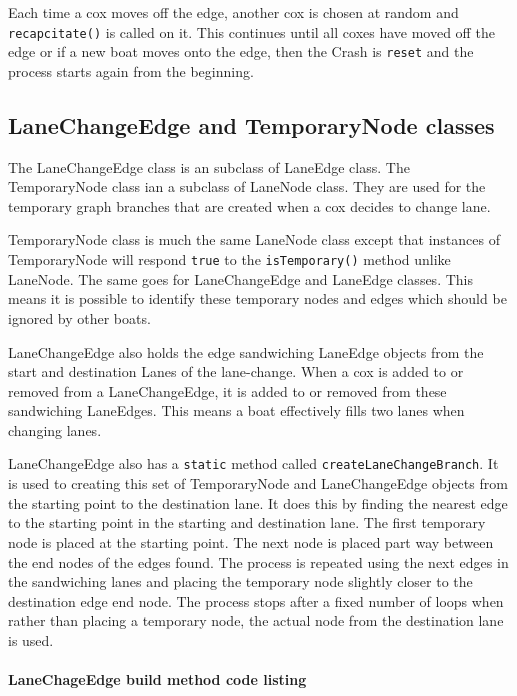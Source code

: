 Each time a cox moves off the edge, another cox is chosen at
random and \texttt{recapcitate()} is called on it. This continues
until all coxes have moved off the edge or if a new boat moves onto
the edge, then the Crash is \texttt{reset} and the process starts
again from the beginning.

\subsection{LaneChangeEdge and TemporaryNode classes}\label{software:lane:lanechange}

The LaneChangeEdge class is an subclass of LaneEdge class. The
TemporaryNode class ian a subclass of LaneNode class. They are used
for the temporary graph branches that are created when a cox decides
to change lane.

TemporaryNode class is much the same LaneNode class except that
instances of TemporaryNode will respond \texttt{true} to the
\texttt{isTemporary()} method unlike
LaneNode. The same goes for LaneChangeEdge and LaneEdge classes. This
means it is possible to identify these temporary nodes and edges which
should be ignored by other boats.

LaneChangeEdge also holds the edge sandwiching LaneEdge objects from
the start and destination Lanes of the lane-change. When a cox is
added to or removed from a LaneChangeEdge, it is added to or removed
from these sandwiching LaneEdges. This means a boat effectively fills
two lanes when changing lanes.

LaneChangeEdge also has a \texttt{static} method called \texttt{createLaneChangeBranch}. It is used to creating this
set of TemporaryNode and LaneChangeEdge objects from the starting
point to the destination lane. It does this by finding the nearest
edge to the starting point in the starting and destination lane. The
first temporary node is placed at the starting point. The next node is
placed part way between the end nodes of the edges found. The process
is repeated using the next edges in the sandwiching lanes and placing
the temporary node slightly closer to the destination edge end
node. The process stops after a fixed number of loops when rather than
placing a temporary node, the actual node from the destination lane is
used.

\paragraph{LaneChageEdge build method code listing}

